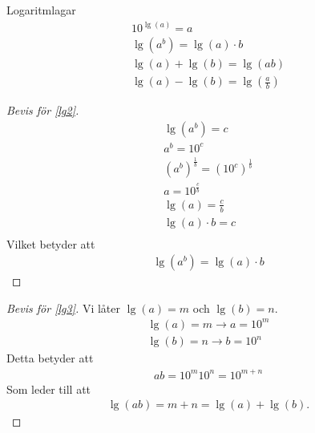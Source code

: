 \begin{theorem}{Logaritmlagar}
	\begin{align}
	10^{\lg(a)}=a \\
	\lg(a^b) = \lg(a)\cdot b \label{lg2} \\
	\lg(a)+\lg(b) = \lg(ab) \label{lg3} \\
	\lg(a)-\lg(b) = \lg\left(\frac{a}{b}\right) \label{lg4}
\end{align} 
\end{theorem}	

\begin{proof}[Bevis för \eqref{lg2}]
	\begin{align}
		\lg(a^b) = c \\ 
		a^b = 10^c \\
		(a^b)^{\frac{1}{b}} = (10^c)^{\frac{1}{b}} \\
		a = 10^{\frac{c}{b}} \\
		\lg(a) = \frac{c}{b} \\
		\lg(a)\cdot b = c \\
	\end{align}
	Vilket betyder att
	\begin{align}
		\lg(a^b) = \lg(a)\cdot b
	\end{align}
\end{proof}

\begin{proof}[Bevis för \eqref{lg3}]
	Vi låter $\lg(a) = m$ och $\lg(b) = n$.
	\begin{align}
		\lg(a) = m \rightarrow a = 10^m \\
		\lg(b) = n \rightarrow b = 10^n
	\end{align}
	Detta betyder att
	\begin{align}
		ab = 10^m10^n = 10^{m+n}
	\end{align}
	Som leder till att
	\begin{align}
		\lg(ab) = m+n = \lg(a)+\lg(b).
	\end{align}
\end{proof}

